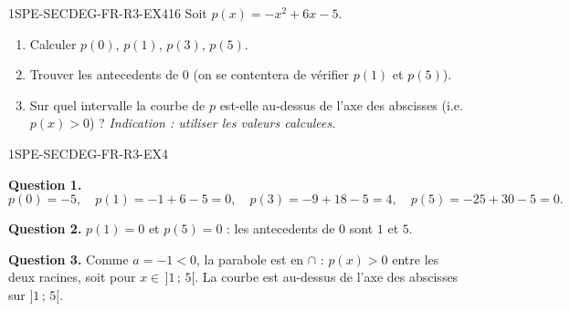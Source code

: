 \begin{exercice}{1SPE-SECDEG-FR-R3-EX4}{1}{6}
Soit $p(x) = -x^2 + 6x - 5$.
\begin{enumerate}
  \item Calculer $p(0)$, $p(1)$, $p(3)$, $p(5)$.
  \item Trouver les antecedents de $0$ (on se contentera de vérifier $p(1)$ et $p(5)$).
  \item Sur quel intervalle la courbe de $p$ est-elle au-dessus de l'axe des abscisses (i.e. $p(x) > 0$) ?
    \textit{Indication : utiliser les valeurs calculees.}
\end{enumerate}
\end{exercice}


\begin{corrige}{1SPE-SECDEG-FR-R3-EX4}

\textbf{Question 1.}
\[
p(0) = -5, \quad p(1) = -1 + 6 - 5 = 0, \quad p(3) = -9 + 18 - 5 = 4, \quad p(5) = -25 + 30 - 5 = 0.
\]

\textbf{Question 2.} $p(1) = 0$ et $p(5) = 0$ : les antecedents de $0$ sont $1$ et $5$.

\textbf{Question 3.} Comme $a = -1 < 0$, la parabole est en $\cap$ : $p(x) > 0$ entre les deux racines, soit pour $x \in \,]1\,;\,5[$. La courbe est au-dessus de l'axe des abscisses sur $]1\,;\,5[$.

\end{corrige}
